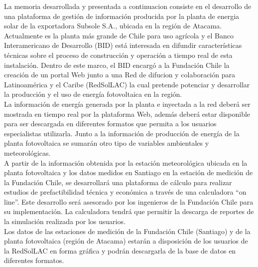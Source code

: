 La memoria desarrollada y presentada a continuacion consiste en el desarrollo de una plataforma de gestión de información producida por la planta de energia solar de la exportadora Subsole S.A., ubicada en la región de Atacama.
Actualmente es la planta más grande de Chile para uso agrícola y el Banco Interamericano de Desarrollo (BID) está interesada en difundir características técnicas sobre el proceso de construcción y operación a tiempo real de esta instalación.
Dentro de este marco, el BID encargó a la Fundación Chile la creación de un portal Web junto a una Red de difucion y colaboración para Latinoamérica y el Caribe (RedSolLAC) la cual pretende potenciar y desarrollar la producción y el uso de energía fotovoltaica en la región.\\

La información de energía generada por la planta e inyectada a la red deberá ser mostrada en tiempo real por la plataforma Web, además deberá estar disponible para ser descargada en diferentes formatos que permita a los usuarios especialistas utilizarla. Junto a la información de producción de energía de la planta fotovoltaica se sumarán otro tipo de variables ambientales y meteorológicas.\\

A partir de la información obtenida por la estación meteorológica ubicada en la planta fotovoltaica y los datos medidos en Santiago en la estación de medición de la Fundación Chile, se desarrollará una plataforma de cálculo para realizar estudios de prefactibilidad técnica y económica a través de una calculadora “on line”.
Este desarrollo será asesorado por los ingenieros de la Fundación Chile para su implementación.
La calculadora tendrá que permitir la descarga de reportes de la simulación realizada por los usuarios.\\

Los datos de las estaciones de medición de la Fundación Chile (Santiago) y de la planta fotovoltaica (región de Atacama) estarán a disposición de los usuarios de la RedSolLAC en forma gráfica y podrán descargarla de la base de datos en diferentes formatos.
